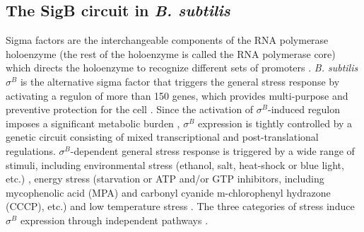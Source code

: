 \subsection{The SigB circuit in \textit{B. subtilis}}

Sigma factors are the interchangeable components of 
the RNA polymerase holoenzyme (the rest of the holoenzyme
is called the RNA polymerase core) which directs the holoenzyme
to recognize different sets of promoters \cite{osterberg11}.
\textit{B. subtilis} $\sigma^B$ is the alternative sigma
factor that triggers the general stress response by 
activating a regulon of more than 150 genes, which provides
multi-purpose and preventive protection for the cell \cite{hecker07}.
Since the activation of $\sigma^B$-induced regulon imposes
a significant metabolic burden \cite{schweder99},
$\sigma^B$ expression is tightly controlled by a genetic circuit
consisting of mixed transcriptional and post-translational regulations.
$\sigma^B$-dependent general stress response is triggered 
by a wide range of stimuli, including environmental stress
(ethanol, salt, heat-shock or blue light, etc.) 
\cite{voelker95,gaidenko06}, energy stress (starvation or
ATP and/or GTP inhibitors, including mycophenolic acid (MPA) and
carbonyl cyanide m-chlorophenyl hydrazone (CCCP), etc.)
\cite{hecker07} and low temperature stress \cite{brigulla03}.
The three categories of stress induce $\sigma^B$ expression through
independent pathways \cite{voelker95, brigulla03}.

